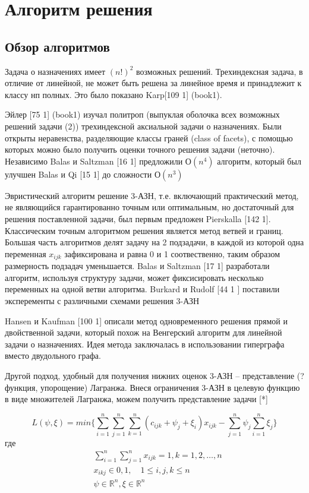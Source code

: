 \chapter{Алгоритм решения}
\section{Обзор алгоритмов}

Задача о назначениях имеет $(n!)^2$ возможных решений. Трехиндексная задача, в отличие от линейной, не может 
быть решена за линейное время и принадлежит к классу нп полных. Это было показано Karp[109 1] (book1).

Эйлер [75 1] (book1) изучал политроп (выпуклая оболочка всех возможных решений задачи (2)) трехиндексной аксиальной задачи о назначениях. Были открыты неравенства, разделяющие классы граней (class of facets), с помощью которых можно было получить оценки точного решения задачи (неточно). Независимо Balas и Saltzman [16 1] предложили $О(n^4)$ алгоритм,
который был улучшен Balas и Qi [15 1] до сложности $О(n^3)$

Эвристический алгоритм решение 3-АЗН, т.е. включающий практический метод, не являющийся гарантированно точным или оптимальным, но достаточный для решения поставленной задачи, был первым предложен Pierskalla [142 1]. Классическим точным алгоритмом решения является метод ветвей и границ. Большая часть алгоритмов делят задачу на 2 подзадачи, в каждой из которой одна переменная $x_{ijk}$ зафиксирована и равна 0 и 1 соотвественно, таким образом размерность подзадач уменьшается. Balas и Saltzman [17 1] разработали алгоритм, используя структуру задачи, может фиксисировать несколько переменных на одной ветви алгоритма. Burkard и Rudolf [44 1 ] поставили эксперементы с различными схемами решения 3-АЗН 

Hansen и Kaufman [100 1] описали метод одновременного решения прямой и двойственной задачи, который похож на Венгерский алгоритм для линейной задачи о назначениях. Идея метода заключалась в использовании гиперграфа вместо двудольного графа.

Другой подход, удобный для получения нижних оценок 3-АЗН -- представление (? функция, упорощение) Лагранжа. 
Внеся ограничения 3-АЗН в целевую функцию в виде множителей Лагранжа, можем получить представление задачи [*]

\[
L(\psi,\xi) = min \{ \sum^n_{i = 1} \sum^n_{j = 1}  \sum^n_{k = 1} 
(c_{ijk} + \psi_j + \xi_i) x_{ijk} - \sum^n_{j=1}\psi_j \sum^n_{i=1}\xi_j  \}
\]
где 
\begin{align*}
& \sum^n_{i = 1} \sum^n_{j = 1} x_{ijk} = 1, k=1,2, \ldots , n \\
& x_{ikj} \in {0,1}, \quad  1 \leq i,j,k \leq n \\
& \psi \in \mathbb{R}^n, \xi \in \mathbb{R}^n
\end{align*}

